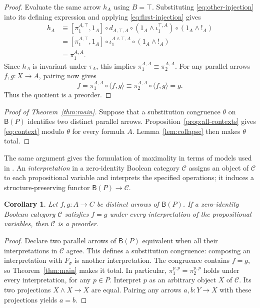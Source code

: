 \documentclass[11pt]{article}
\newtheorem{corollary}[theorem]{Corollary}
\newcommand{\B}{\mathsf B}
\begin{document}
\begin{proof}
Evaluate the same arrow $h_A$ using $B=\top$.
Substituting \eqref{eq:other-injection} into its defining expression
and applying \eqref{eq:first-injection} gives
\[
 \begin{aligned}
 h_A
   &\equiv[\pi_1^{A,\top},1_A]\circ d_{A,\top,A}
       \circ(1_A\wedge\iota_1^{\top,A})
       \circ(1_A\wedge!_A)\\
   &=[\pi_1^{A,\top},1_A]\circ\iota_1^{A\wedge\top,A}
       \circ(1_A\wedge!_A)\\
   &=\pi_1^{A,A}.
 \end{aligned}
\]
Since $h_A$ is invariant under $\tau_A$, this implies
$\pi_1^{A,A}\equiv\pi_2^{A,A}$.
For any parallel arrows $f,g:X\to A$, pairing now gives
\[
 f=\pi_1^{A,A}\circ\langle f,g\rangle
   \equiv\pi_2^{A,A}\circ\langle f,g\rangle=g.
\]
Thus the quotient is a preorder.
\end{proof}

\begin{proof}[Proof of Theorem~\ref{thm:main}]
Suppose that a substitution congruence $\theta$ on $\B(P)$ identifies
two distinct parallel arrows. Proposition~\ref{prop:all-contexts}
gives \eqref{eq:context} modulo $\theta$ for every formula $A$.
Lemma~\ref{lem:collapse} then makes $\theta$ total.
\end{proof}

The same argument gives the formulation of maximality in terms of
models used in \cite[\S9.3, p.~194]{DP}. An \emph{interpretation} in
a zero-identity Boolean category $\mathcal C$ assigns an object of
$\mathcal C$ to each propositional variable and interprets the
specified operations; it induces a structure-preserving functor
$\B(P)\to\mathcal C$.

\begin{corollary}\label{cor:models}
Let $f,g:A\to C$ be distinct arrows of $\B(P)$.
If a zero-identity Boolean category $\mathcal C$ satisfies $f=g$
under every interpretation of the propositional variables, then
$\mathcal C$ is a preorder.
\end{corollary}

\begin{proof}
Declare two parallel arrows of $\B(P)$ equivalent when all their
interpretations in $\mathcal C$ agree. This defines a substitution
congruence: composing an interpretation with $F_\sigma$ is another
interpretation. The congruence contains $f=g$, so
Theorem~\ref{thm:main} makes it total. In particular,
$\pi_1^{p,p}=\pi_2^{p,p}$ holds under every interpretation, for any
$p\in P$. Interpret $p$ as an arbitrary object $X$ of $\mathcal C$.
Its two projections $X\wedge X\to X$ are equal. Pairing any arrows
$a,b:Y\to X$ with these projections yields $a=b$.
\end{proof}
\end{document}
